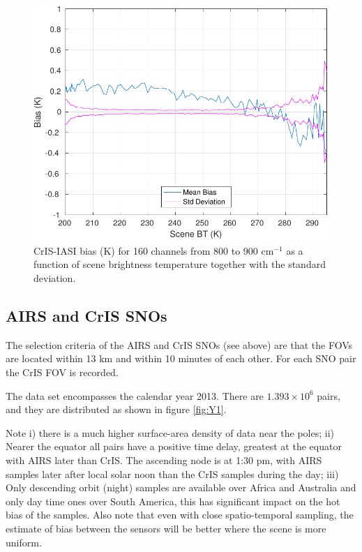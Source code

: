\documentclass[twocolumn,10pt]{article}
\begin{document}
\begin{figure}[htb]
\centering
\includegraphics[width=\linewidth]{./figs/IC_jplSNO_Bias_std_160LWchns_vsScene.pdf}
\caption{\label{fig:orgparagraph9}
  CrIS-IASI bias (K) for 160 channels from 800 to 900 cm$^{-1}$ as a function of scene brightness temperature together with the standard deviation.}
\label{fig:X8}
\end{figure}


\subsection{AIRS and CrIS SNOs}
\label{sec:orgheadline9}

The selection criteria of the AIRS and CrIS SNOs (see above) are that the FOVs are located
within 13 km and within 10 minutes of each other. For each SNO pair the CrIS FOV is recorded. 

The data set encompasses the calendar year 2013. There are $1.393\times 10^{6}$ pairs, and they are distributed as shown in figure \ref{fig:Y1}.

Note i) there is a much higher surface-area density of data near the poles; 
ii) Nearer the equator all pairs have a positive time delay, greatest at the equator with AIRS later than CrIS. The ascending node is at 1:30 pm, with
AIRS samples later after local solar noon than the CrIS samples during the day; 
iii) Only descending orbit (night) samples are available over Africa and Australia and only day time ones over South America, this has significant impact on the hot bias of the samples. Also note that even with close spatio-temporal sampling, the estimate of bias between the sensors will be better where the scene is more uniform.
\end{document}
